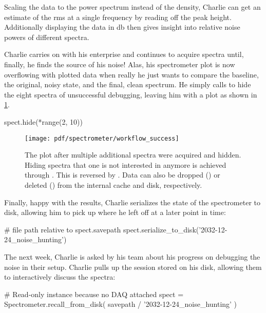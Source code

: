 Scaling the data to the power spectrum instead of the density, Charlie can get an estimate of the \gls{rms} at a single frequency by reading off the peak height.
Additionally displaying the data in \unit{\decibel} then gives insight into relative noise powers of different spectra.

Charlie carries on with his enterprise and continues to acquire spectra until, finally, he finds the source of his noise!
Alas, his spectrometer plot is now overflowing with plotted data when really he just wants to compare the baseline, the original, noisy state, and the final, clean spectrum.
He simply calls %
to hide the eight spectra of unsuccessful debugging, leaving him with a plot as shown in \cref{fig:speck:software:workflow_success}.
\begin{py}
    spect.hide(*range(2, 10))
\end{py}

\begin{figure}
    \centering
    \texttt{[image: pdf/spectrometer/workflow\_success]}
    \caption{
        The \pyspeck plot after multiple additional spectra were acquired and hidden.
        Hiding spectra that one is not interested in anymore is achieved through .
        This is reversed by .
        Data can also be dropped () or deleted () from the internal cache and disk, respectively.
    }
    \label{fig:speck:software:workflow_success}
\end{figure}

Finally, happy with the results, Charlie serializes the state of the spectrometer to disk, allowing him to pick up where he left off at a later point in time:
\begin{py}
    # file path relative to spect.savepath
    spect.serialize_to_disk('2032-12-24_noise_hunting')
\end{py}
The next week, Charlie is asked by his team about his progress on debugging the noise in their setup.
Charlie pulls up the  session stored on his disk, allowing them to interactively discuss the spectra:
\begin{py}
    # Read-only instance because no DAQ attached
    spect = Spectrometer.recall_from_disk(
        savepath / '2032-12-24_noise_hunting'
    )
\end{py}


